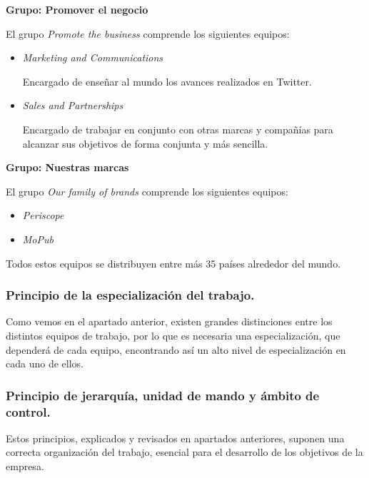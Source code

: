 \textbf{Grupo: Promover el negocio}

El grupo \textit{Promote the business} comprende los siguientes equipos:

\begin{itemize}

\item \textit{Marketing and Communications}

Encargado de enseñar al mundo los avances realizados en Twitter.

\item \textit{Sales and Partnerships}

Encargado de trabajar en conjunto con otras marcas y compañías para alcanzar sus objetivos de forma conjunta y más sencilla.

\end{itemize}

\textbf{Grupo: Nuestras marcas}

El grupo \textit{Our family of brands} comprende los siguientes equipos:

\begin{itemize}

\item \textit{Periscope}
\item \textit{MoPub}\\

\end{itemize}



Todos estos equipos se distribuyen entre más 35 países alrededor del mundo.

\subsubsection{Principio de la especialización del trabajo.}

Como vemos en el apartado anterior, existen grandes distinciones entre los distintos equipos de trabajo, por lo que es necesaria una especialización, que dependerá de cada equipo, encontrando así un alto nivel de especialización en cada uno de ellos.

\subsubsection{Principio de jerarquía, unidad de mando y ámbito de control.}

Estos principios, explicados y revisados en apartados anteriores, suponen una correcta organización del trabajo, esencial para el desarrollo de los objetivos de la empresa.

